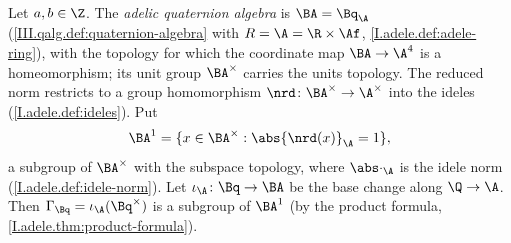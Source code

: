 Let $a,b\in\Z$. The \emph{adelic quaternion algebra} is $\BA=\Bq_{\A}$ (\cref{III.qalg.def:quaternion-algebra} with $R=\A=\R\times\Af$,
\cref{I.adele.def:adele-ring}), with the topology for which the coordinate map $\BA\to\A^4$ is a homeomorphism; its unit group $\BA^\times$
carries the units topology. The reduced norm restricts to a group homomorphism $\nrd\colon\BA^\times\to\A^\times$ into the ideles
(\cref{I.adele.def:ideles}). Put
\[
  \BA^1=\{x\in\BA^\times:\abs{\nrd(x)}_\A=1\},
\]
a subgroup of $\BA^\times$ with the subspace topology, where $\abs\cdot_\A$ is the idele norm (\cref{I.adele.def:idele-norm}). Let
$\iota_\A\colon\Bq\to\BA$ be the base change along $\Q\to\A$. Then $\Gamma_{\Bq}=\iota_\A(\Bq^\times)$ is a subgroup of $\BA^1$ (by the
product formula, \cref{I.adele.thm:product-formula}).
